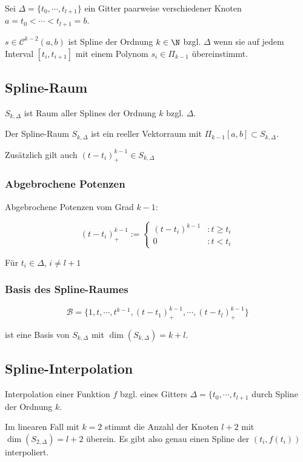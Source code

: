 Sei $\Delta = \{t_0,\cdots,t_{l+1}\}$ ein Gitter paarweise verschiedener Knoten $a=t_0 < \cdots < t_{l+1} = b$.

$s \in \mathcal{C}^{k-2}(a,b)$ ist Spline der Ordnung $k \in \N$ bzgl. $\Delta$ wenn sie auf jedem Interval $[t_i,t_{i+1}]$ mit einem Polynom $s_i \in \Pi_{k-1}$ übereinstimmt.

\subsection*{Spline-Raum}

$S_{k,\Delta}$ ist Raum aller Splines der Ordnung $k$ bzgl. $\Delta$.

Der Spline-Raum $S_{k,\Delta}$ ist ein reeller Vektorraum mit $\Pi_{k-1}[a,b] \subset S_{k,\Delta}$.

Zusätzlich gilt auch $(t-t_i)_+^{k-1} \in S_{k,\Delta}$

\subsubsection*{Abgebrochene Potenzen}

Abgebrochene Potenzen vom Grad $k-1$:

$$(t-t_i)_+^{k-1} := \begin{cases}(t-t_i)^{k-1} &: t \geq t_i \\ 0 &: t < t_i\end{cases}$$

Für $t_i \in \Delta$, $i \neq l+1$

\subsubsection*{Basis des Spline-Raumes}

$$\mathcal{B} = \{1,t,\cdots,t^{k-1},(t-t_1)_+^{k-1},\cdots,(t-t_l)_+^{k-1}\}$$

ist eine Basis von $S_{k,\Delta}$ mit $\dim(S_{k,\Delta}) = k + l$.

\subsection*{Spline-Interpolation}

Interpolation einer Funktion $f$ bzgl. eines Gitters $\Delta = \{t_0,\cdots,t_{l+1}$ durch Spline der Ordnung $k$.

\spacing

Im linearen Fall mit $k=2$ stimmt die Anzahl der Knoten $l+2$ mit $\dim(S_{2,\Delta})=l+2$ überein. Es gibt also genau einen Spline der $(t_i,f(t_i))$ interpoliert.


